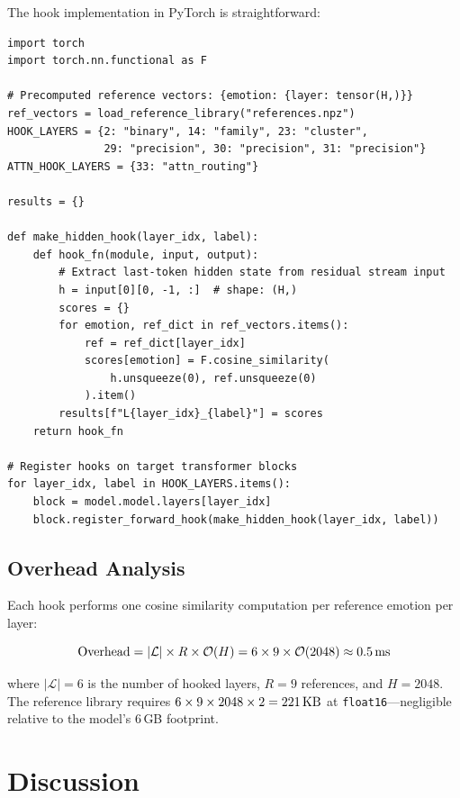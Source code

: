 \documentclass[11pt,a4paper]{article}
\begin{document}
The hook implementation in PyTorch is straightforward:

\begin{lstlisting}[caption={Emotion monitoring hook registration.}, label={lst:hook}]
import torch
import torch.nn.functional as F

# Precomputed reference vectors: {emotion: {layer: tensor(H,)}}
ref_vectors = load_reference_library("references.npz")
HOOK_LAYERS = {2: "binary", 14: "family", 23: "cluster",
               29: "precision", 30: "precision", 31: "precision"}
ATTN_HOOK_LAYERS = {33: "attn_routing"}

results = {}

def make_hidden_hook(layer_idx, label):
    def hook_fn(module, input, output):
        # Extract last-token hidden state from residual stream input
        h = input[0][0, -1, :]  # shape: (H,)
        scores = {}
        for emotion, ref_dict in ref_vectors.items():
            ref = ref_dict[layer_idx]
            scores[emotion] = F.cosine_similarity(
                h.unsqueeze(0), ref.unsqueeze(0)
            ).item()
        results[f"L{layer_idx}_{label}"] = scores
    return hook_fn

# Register hooks on target transformer blocks
for layer_idx, label in HOOK_LAYERS.items():
    block = model.model.layers[layer_idx]
    block.register_forward_hook(make_hidden_hook(layer_idx, label))
\end{lstlisting}

\subsection{Overhead Analysis}

Each hook performs one cosine similarity computation per reference emotion per layer:

\begin{equation}
  \text{Overhead} = |\mathcal{L}| \times R \times \mathcal{O}(H) = 6 \times 9 \times \mathcal{O}(2048) \approx 0.5\text{\,ms}
\end{equation}

where $|\mathcal{L}| = 6$ is the number of hooked layers, $R = 9$ references, and $H = 2048$. The reference library requires $6 \times 9 \times 2048 \times 2 = 221\text{\,KB}$ at \texttt{float16}---negligible relative to the model's 6\,GB footprint.

\section{Discussion}
\end{document}
